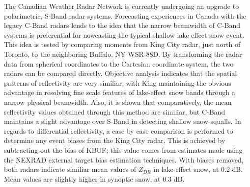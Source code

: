 The Canadian Weather Radar Network is currently undergoing an upgrade to polarimetric, S-Band radar 
systems. Forecasting experiences in Canada with the legacy C-Band radars lends to the idea that the 
narrow beamwidth of C-Band systems is preferential for nowcasting the typical shallow lake-effect snow 
event. This idea is tested by comparing moments from King City radar, just north of Toronto, to the 
neighboring Buffalo, NY WSR-88D. By transforming the radar data from spherical coordinates to the 
Cartesian coordinate system, the two radars can be compared directly. Objective analysis indicates that 
the spatial patterns of reflectivity are very similiar, with King maintaining the obvious advantage in 
resolving fine scale features of lake-effect snow bands through a narrow physical beamwidth. Also, it is 
shown that comparatively, the mean reflectivity values obtained through this method are similiar, but C-Band maintains a slight advantage over S-Band in 
detecting shallow snow-squalls. In regards to differential reflectivity, a case by case comparison is performed to determine any event biases
from the King City radar. This is achieved by subtracting out the bias of KBUF; this value comes from 
estimates made using the NEXRAD external target bias estimation techniques. With biases removed, both radars indicate similiar mean values of $Z_{DR}$ in lake-effect snow, at 0.2 dB. Mean values are slightly higher in synoptic snow, at 0.3 dB.
